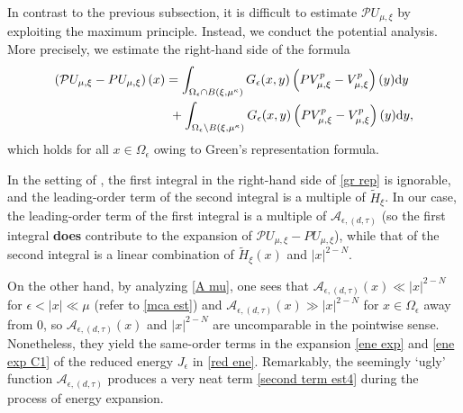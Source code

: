\documentclass[reqno]{amsart}
\theoremstyle{remark}
\newcommand{\ep}{\epsilon}
\newcommand{\mca}{\mathcal{A}}
\newcommand{\mcp}{\mathcal{P}}
\newcommand{\wth}{\widetilde{H}}
\newcommand{\dy}{\textup{d}y}
\newcommand{\mx}{{\mu,\xi}}
\renewcommand{\(}{\left(}
\renewcommand{\)}{\right)}
\numberwithin{equation}{section}
\begin{document}
\noindent In contrast to the previous subsection, it is difficult to estimate $\mcp U_\mx$ by exploiting the maximum principle. Instead, we conduct the potential analysis. More precisely, we estimate the right-hand side of the formula
\begin{equation}\label{gr rep}
\begin{aligned}
\(\mcp U_\mx-PU_\mx\)(x) &=\int_{\Omega_\ep \cap B(\xi,\mu^\kappa)} G_\ep(x,y)\(PV_\mx^p-V_\mx^p\)(y)\dy \\
&\ +\int_{\Omega_\ep\setminus B(\xi,\mu^\kappa)} G_\ep(x,y) \(PV_\mx^p-V_\mx^p\)(y)\dy,
\end{aligned}
\end{equation}
which holds for all $x \in \Omega_\ep$ owing to Green's representation formula.

In the setting of \cite{KP}, the first integral in the right-hand side of \eqref{gr rep} is ignorable,
and the leading-order term of the second integral is a multiple of $\wth_\xi$.
In our case, the leading-order term of the first integral is a multiple of $\mca_{\ep,(d,\tau)}$ (so the first integral \textbf{does} contribute to the expansion of $\mcp U_\mx-PU_\mx$), while that of the second integral is a linear combination of $\wth_\xi(x)$ and $|x|^{2-N}$.

On the other hand, by analyzing \eqref{A mu}, one sees that $\mca_{\ep,(d,\tau)}(x) \ll |x|^{2-N}$ for $\ep < |x| \ll \mu$ (refer to \eqref{mca est}) and $\mca_{\ep,(d,\tau)}(x) \gg |x|^{2-N}$ for $x \in \Omega_\ep$ away from 0, so $\mca_{\ep,(d,\tau)}(x)$ and $|x|^{2-N}$ are uncomparable in the pointwise sense.
Nonetheless, they yield the same-order terms in the expansion \eqref{ene exp} and \eqref{ene exp C1} of the reduced energy $J_\ep$ in \eqref{red ene}.
Remarkably, the seemingly `ugly' function $\mca_{\ep,(d,\tau)}$ produces a very neat term \eqref{second term est4} during the process of energy expansion.
\end{document}
